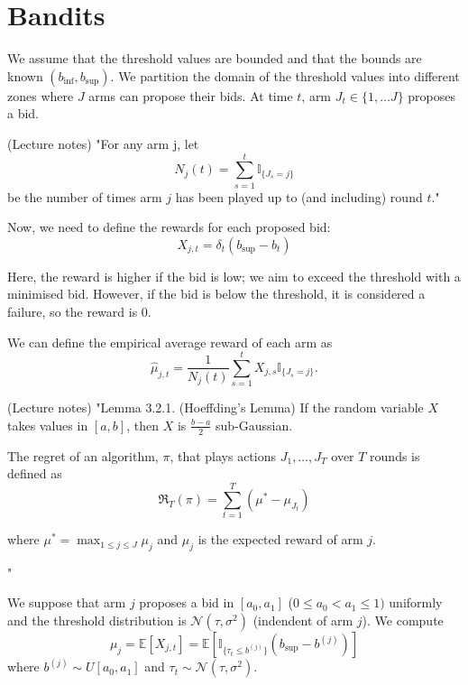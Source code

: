 \documentclass[11pt]{article}
\begin{document}
\section*{Bandits}

We assume that the threshold values are bounded and that the bounds are known $(b_{\inf}, b_{\sup})$. We partition the domain of the threshold values into different zones where $J$ arms can propose their bids. At time $t$, arm $J_t \in \{1, \dots J\}$ proposes a bid.


(Lecture notes)
"For any arm j, let
\[
 N_j(t) = \sum_{s=1}^{t} \mathbb{I}_{\{J_s = j\}}
\]
be the number of times arm $j$ has been played up to (and including) round $t$."

Now, we need to define the rewards for each proposed bid:
\[
  X_{j,t} = \delta_t (b_{\sup} - b_t)
\]

Here, the reward is higher if the bid is low; we aim to exceed the threshold 
with a minimised bid. However, if the bid is below the threshold, it is considered a failure, so the reward is 0.

We can define the empirical average reward of each arm as
\[
\hat{\mu}_{j,t} = \frac{1}{N_j(t)}\sum_{s=1}^{t} X_{j,s} \mathbb{I}_{\{J_s = j\}}.
\]

(Lecture notes)
"Lemma 3.2.1. (Hoeffding's Lemma) If the random variable $X$ takes values in $[a, b]$,
then $X$ is $\frac{b-a}{2}$ sub-Gaussian.

The regret of an algorithm, $\pi$, that plays actions $J_1, \dots, J_T$ over
$T$ rounds is defined as
\[
  \mathfrak{R}_T(\pi) = \sum_{t=1}^{T}(\mu^* - \mu_{J_t}) 
\]

where $\mu^* =  \max_{1\leq j \leq J} \mu_j$ and $\mu_{j}$ is the expected reward of arm $j$.

"

We suppose that arm $j$ proposes a bid in $[a_0, a_1]$ ($0\leq a_0 < a_1 \leq 1)$ uniformly and the threshold distribution is $\mathcal{N}(\tau, \sigma^2)$ (indendent of arm $j$). We compute
\[
\mu_j = \mathbb{E}[X_{j,t}] =  \mathbb{E}[\mathbb{I}_{\{\tau_t \leq b^{(j)}\}}(b_{\sup}-b^{(j)})]
\]
where $b^{(j)} \sim U[a_0, a_1]$ and $\tau_t \sim \mathcal{N}(\tau, \sigma^2)$.
\end{document}
